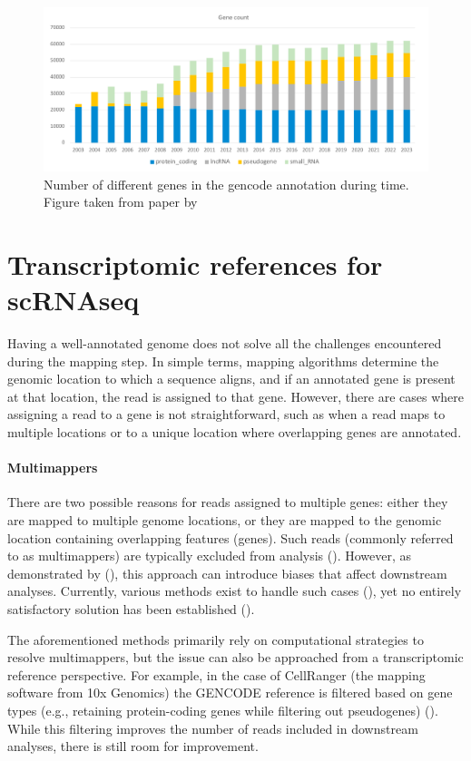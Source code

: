 \begin{figure}
  \centering
  \includegraphics[width=\linewidth]{images/gencode.png}
  \caption{Number of different genes in the gencode annotation during time. Figure taken from paper by \textcite{Guigo2023}}
  \label{fig:gencode}
\end{figure}

\section{Transcriptomic references for scRNAseq}

Having a well-annotated genome does not solve all the challenges encountered during the mapping step.
In simple terms, mapping algorithms determine the genomic location to which a sequence aligns,
and if an annotated gene is present at that location, the read is assigned to that gene.
However, there are cases where assigning a read to a gene is not straightforward,
such as when a read maps to multiple locations or to a unique location where overlapping genes are annotated.

\paragraph{Multimappers}
There are two possible reasons for reads assigned to multiple genes: either they are mapped to multiple genome locations,
or they are mapped to the genomic location containing overlapping features (genes).
Such reads (commonly referred to as multimappers) are typically excluded from analysis (\cite{Paz2024}).
However, as demonstrated by (\textcite{Paz2024}), this approach can introduce biases that affect downstream analyses.
Currently, various methods exist to handle such cases (\cite{Francoeur2020}),
yet no entirely satisfactory solution has been established (\cite{Paz2024}).

The aforementioned methods primarily rely on computational strategies to resolve multimappers,
but the issue can also be approached from a transcriptomic reference perspective.
For example, in the case of CellRanger (the mapping software from 10x Genomics)
the GENCODE reference is filtered based on gene types (e.g., retaining protein-coding genes while filtering out pseudogenes) (\cite{10xRef}).
While this filtering improves the number of reads included in downstream analyses, there is still room for improvement.

